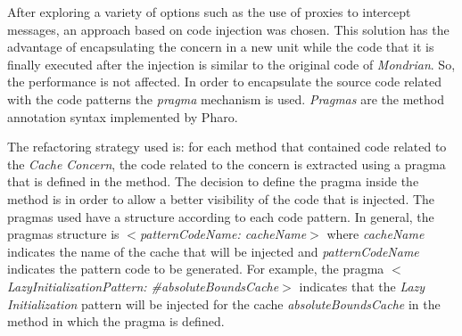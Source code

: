 \documentclass[preprint,10pt]{sigplanconf}
\begin{document}
After exploring a variety of options such as the use of proxies to
intercept messages, an approach based on code injection was chosen.
This solution has the advantage of encapsulating the concern in a
new unit while the code that it is finally executed after the injection
is similar to the original code of \emph{Mondrian}. So, the performance
is not affected. In order to encapsulate the source code related with
the code patterns the \emph{pragma} mechanism is used. \emph{Pragmas}
are the method annotation syntax implemented by Pharo.

The refactoring strategy used is: for each method that contained code
related to the \emph{Cache Concern}, the code related to the concern
is extracted using a pragma that is defined in the method. The decision
to define the pragma inside the method is in order to allow a better
visibility of the code that is injected. The pragmas used have a structure
according to each code pattern.\emph{ }In general, the pragmas structure
is \emph{$<$patternCodeName: cacheName$>$} where \emph{cacheName}
indicates the name of the cache that will be injected and \emph{patternCodeName}
indicates the pattern code to be generated. For example, the pragma
\emph{$<$LazyInitializationPattern: \#absoluteBoundsCache$>$} indicates
that the \emph{Lazy Initialization} pattern will be injected for the cache
\emph{absoluteBoundsCache} in the method in which the pragma is defined.
\end{document}
